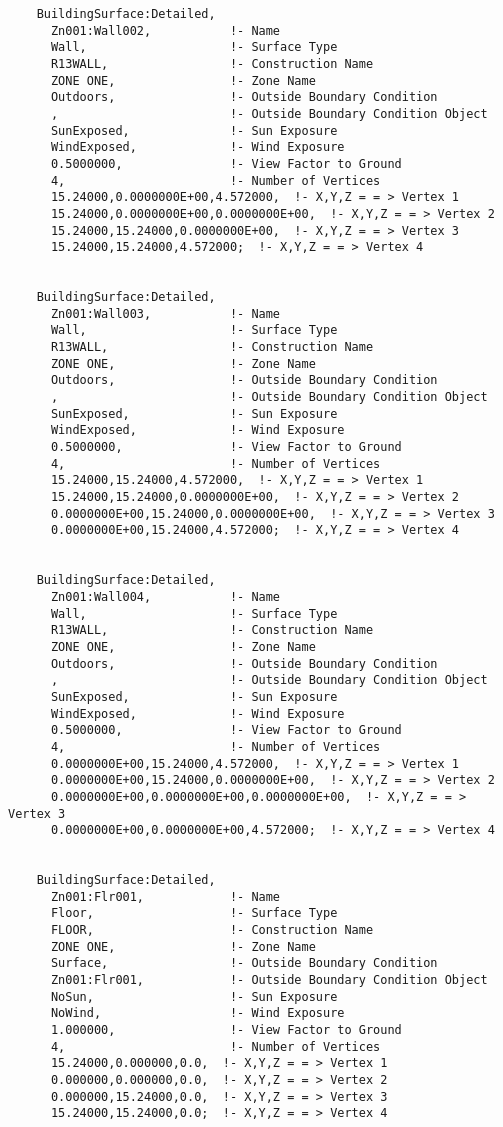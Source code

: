 \begin{lstlisting}
    BuildingSurface:Detailed,
      Zn001:Wall002,           !- Name
      Wall,                    !- Surface Type
      R13WALL,                 !- Construction Name
      ZONE ONE,                !- Zone Name
      Outdoors,                !- Outside Boundary Condition
      ,                        !- Outside Boundary Condition Object
      SunExposed,              !- Sun Exposure
      WindExposed,             !- Wind Exposure
      0.5000000,               !- View Factor to Ground
      4,                       !- Number of Vertices
      15.24000,0.0000000E+00,4.572000,  !- X,Y,Z = = > Vertex 1
      15.24000,0.0000000E+00,0.0000000E+00,  !- X,Y,Z = = > Vertex 2
      15.24000,15.24000,0.0000000E+00,  !- X,Y,Z = = > Vertex 3
      15.24000,15.24000,4.572000;  !- X,Y,Z = = > Vertex 4


    BuildingSurface:Detailed,
      Zn001:Wall003,           !- Name
      Wall,                    !- Surface Type
      R13WALL,                 !- Construction Name
      ZONE ONE,                !- Zone Name
      Outdoors,                !- Outside Boundary Condition
      ,                        !- Outside Boundary Condition Object
      SunExposed,              !- Sun Exposure
      WindExposed,             !- Wind Exposure
      0.5000000,               !- View Factor to Ground
      4,                       !- Number of Vertices
      15.24000,15.24000,4.572000,  !- X,Y,Z = = > Vertex 1
      15.24000,15.24000,0.0000000E+00,  !- X,Y,Z = = > Vertex 2
      0.0000000E+00,15.24000,0.0000000E+00,  !- X,Y,Z = = > Vertex 3
      0.0000000E+00,15.24000,4.572000;  !- X,Y,Z = = > Vertex 4


    BuildingSurface:Detailed,
      Zn001:Wall004,           !- Name
      Wall,                    !- Surface Type
      R13WALL,                 !- Construction Name
      ZONE ONE,                !- Zone Name
      Outdoors,                !- Outside Boundary Condition
      ,                        !- Outside Boundary Condition Object
      SunExposed,              !- Sun Exposure
      WindExposed,             !- Wind Exposure
      0.5000000,               !- View Factor to Ground
      4,                       !- Number of Vertices
      0.0000000E+00,15.24000,4.572000,  !- X,Y,Z = = > Vertex 1
      0.0000000E+00,15.24000,0.0000000E+00,  !- X,Y,Z = = > Vertex 2
      0.0000000E+00,0.0000000E+00,0.0000000E+00,  !- X,Y,Z = = > Vertex 3
      0.0000000E+00,0.0000000E+00,4.572000;  !- X,Y,Z = = > Vertex 4


    BuildingSurface:Detailed,
      Zn001:Flr001,            !- Name
      Floor,                   !- Surface Type
      FLOOR,                   !- Construction Name
      ZONE ONE,                !- Zone Name
      Surface,                 !- Outside Boundary Condition
      Zn001:Flr001,            !- Outside Boundary Condition Object
      NoSun,                   !- Sun Exposure
      NoWind,                  !- Wind Exposure
      1.000000,                !- View Factor to Ground
      4,                       !- Number of Vertices
      15.24000,0.000000,0.0,  !- X,Y,Z = = > Vertex 1
      0.000000,0.000000,0.0,  !- X,Y,Z = = > Vertex 2
      0.000000,15.24000,0.0,  !- X,Y,Z = = > Vertex 3
      15.24000,15.24000,0.0;  !- X,Y,Z = = > Vertex 4



\end{lstlisting}
